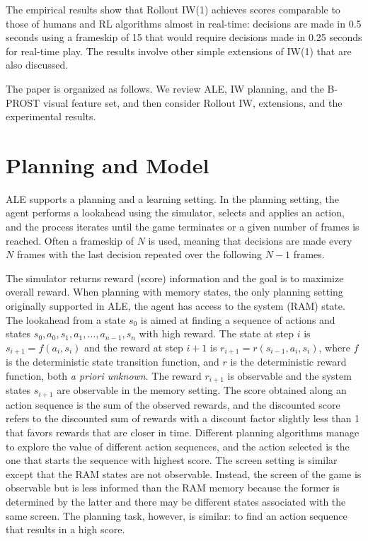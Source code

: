 \documentclass[letterpaper]{article}
\begin{document}
The empirical results show that Rollout IW(1)
achieves  scores comparable to those of humans and RL algorithms
almost in real-time: decisions are made in 0.5 seconds
using a frameskip of 15  that would require decisions made in  0.25 seconds
for real-time play. The results involve other simple extensions of IW(1) that
are also discussed. 

The paper is organized as follows. We review ALE, IW planning, and the B-PROST
visual feature set, and then consider Rollout IW, extensions, and the experimental
results. 


\section{Planning and  Model}

ALE supports a planning and a learning setting. In the planning setting,
the agent performs a lookahead   using the   simulator,
selects and applies  an action, and the process iterates until the game
terminates or a given number of frames is reached.
Often a frameskip of $N$ is used, meaning that decisions are made
every $N$ frames with the  last decision repeated over the following
$N\!-\!1$ frames.

The simulator returns reward (score) information and the goal is to maximize overall reward.  When planning with
memory states, the only planning setting originally supported in ALE, the agent has access to the
system (RAM) state. The lookahead from a state $s_0$ is  aimed  at finding a
sequence of  actions and states  $s_0,a_0,s_1,a_1, \ldots, a_{n-1}, s_n$ with high reward.
The  state at step $i$ is $s_{i+1}=f(a_i,s_i)$ and the reward at step $i+1$ is $r_{i+1}=r(s_{i-1},a_i,s_i)$,
where $f$ is the deterministic state transition function, and $r$ is the deterministic reward function,
both \emph{a priori unknown}. The reward $r_{i+1}$ is observable and
the system states $s_{i+1}$ are observable in the memory setting.
The score obtained along an action sequence is the sum of the observed rewards, and
the discounted score refers to the discounted sum of rewards with
a discount factor slightly less than 1 that favors rewards that are closer in time.
Different planning algorithms manage to explore the value of
different action sequences, and the action selected is the  one that starts
the sequence with highest score. The screen setting is similar except that the
RAM states are not observable. Instead, the screen of the game
is observable but is less informed than the RAM memory  because the former is determined
by the latter and there may be different states associated with the same screen.
The planning task, however, is similar: to find an action sequence that results
in a high score.
\end{document}
